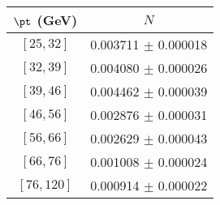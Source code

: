 \begin{tabular}{c||c}
$\pt$ (GeV) & $N$  \\
\hline
$[25, 32]$ & 0.003711 $\pm$ 0.000018\\
$[32, 39]$ & 0.004080 $\pm$ 0.000026\\
$[39, 46]$ & 0.004462 $\pm$ 0.000039\\
$[46, 56]$ & 0.002876 $\pm$ 0.000031\\
$[56, 66]$ & 0.002629 $\pm$ 0.000043\\
$[66, 76]$ & 0.001008 $\pm$ 0.000024\\
$[76, 120]$ & 0.000914 $\pm$ 0.000022\\
\end{tabular}
